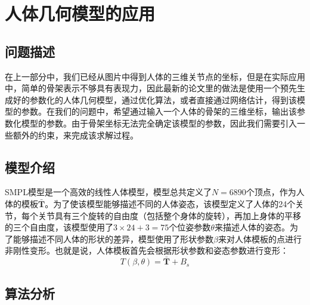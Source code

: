 \section{人体几何模型的应用}
\subsection{问题描述}
在上一部分中，我们已经从图片中得到人体的三维关节点的坐标，但是在实际应用中，简单的骨架表示不够具有表现力，因此最新的论文里的做法是使用一个预先生成好的参数化的人体几何模型，通过优化算法，或者直接通过网络估计，得到该模型的参数。在我们的问题中，希望通过输入一个人体的骨架的三维坐标，输出该参数化模型的参数。由于骨架坐标无法完全确定该模型的参数，因此我们需要引入一些额外的约束，来完成该求解过程。

\subsection{模型介绍}
SMPL模型是一个高效的线性人体模型，模型总共定义了\(N = 6890\)个顶点，作为人体的模板\(\bar{\bm{T}}\)。为了使该模型能够描述不同的人体姿态，该模型定义了人体的24个关节，每个关节具有三个旋转的自由度（包括整个身体的旋转），再加上身体的平移的三个自由度，该模型使用了\(3\times 24 + 3 = 75\)个位姿参数\(\theta\)来描述人体的姿态。为了能够描述不同人体的形状的差异，模型使用了形状参数\(\beta\)来对人体模板的点进行非刚性变形。也就是说，人体模板首先会根据形状参数和姿态参数进行变形：
\begin{equation}
    T(\beta, \theta) = \bar{\bm{T}} + B_s
\end{equation}

\subsection{算法分析}
